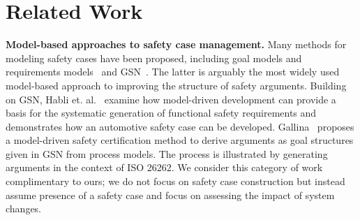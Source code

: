 \vspace{-0.1in}
\section{Related Work}
\label{sec:related}
\vspace{-0.1in}
\noindent
{\bf Model-based approaches to safety case management.}  Many methods
for modeling safety cases have been proposed, including
goal models and requirements models~\cite{Ghanavati:2011,Brunel:2012} and GSN~\cite{Kelly:2004}.  The latter is
arguably the most widely used model-based
approach to improving the structure of safety arguments.  Building on GSN,
Habli et. al.~\cite{Habli:2010} examine how model-driven development can
provide a basis for the systematic generation of functional safety
requirements and demonstrates how an automotive safety case can be developed.  Gallina~\cite{Gallina:2014}
proposes a model-driven safety certification method to derive
arguments as goal structures given in GSN from process models. The
process is illustrated by generating arguments in the context of ISO
26262. We consider this category of work complimentary to ours; we do
not focus on safety case construction but instead
assume presence of a safety case
and focus on assessing the impact of system changes.


